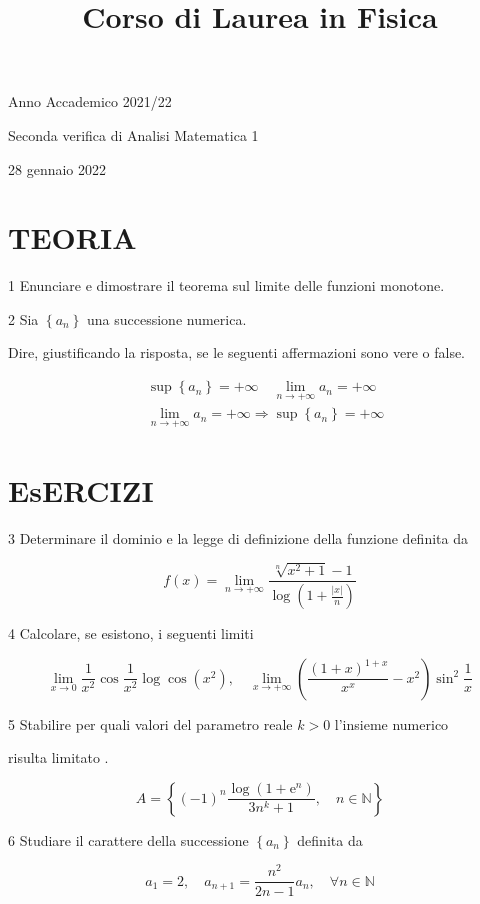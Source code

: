 \documentclass[10pt]{article}
\title{Corso di Laurea in Fisica }
\author{}
\date{}
\begin{document}
\maketitle
Anno Accademico 2021/22

Seconda verifica di Analisi Matematica 1

28 gennaio 2022

\section{TEORIA}
1 Enunciare e dimostrare il teorema sul limite delle funzioni monotone.

2 Sia \(\left\{a_{n}\right\}\) una successione numerica.

Dire, giustificando la risposta, se le seguenti affermazioni sono vere o false.

\[
\begin{aligned}
& \sup \left\{a_{n}\right\}=+\infty \quad \lim _{n \rightarrow+\infty} a_{n}=+\infty \\
& \lim _{n \rightarrow+\infty} a_{n}=+\infty \Longrightarrow \sup \left\{a_{n}\right\}=+\infty
\end{aligned}
\]

\section{EsERCIZI}
3 Determinare il dominio e la legge di definizione della funzione definita da

\[
f(x)=\lim _{n \rightarrow+\infty} \frac{\sqrt[n]{x^{2}+1}-1}{\log \left(1+\frac{|x|}{n}\right)}
\]

4 Calcolare, se esistono, i seguenti limiti

\[
\lim _{x \rightarrow 0} \frac{1}{x^{2}} \cos \frac{1}{x^{2}} \log \cos \left(x^{2}\right), \quad \lim _{x \rightarrow+\infty}\left(\frac{(1+x)^{1+x}}{x^{x}}-x^{2}\right) \sin ^{2} \frac{1}{x}
\]

5 Stabilire per quali valori del parametro reale \(k>0\) l'insieme numerico

risulta limitato .

\[
A=\left\{(-1)^{n} \frac{\log \left(1+\mathrm{e}^{n}\right)}{3 n^{k}+1}, \quad n \in \mathbb{N}\right\}
\]

6 Studiare il carattere della successione \(\left\{a_{n}\right\}\) definita da

\[
a_{1}=2, \quad a_{n+1}=\frac{n^{2}}{2 n-1} a_{n}, \quad \forall n \in \mathbb{N}
\]
\end{document}
